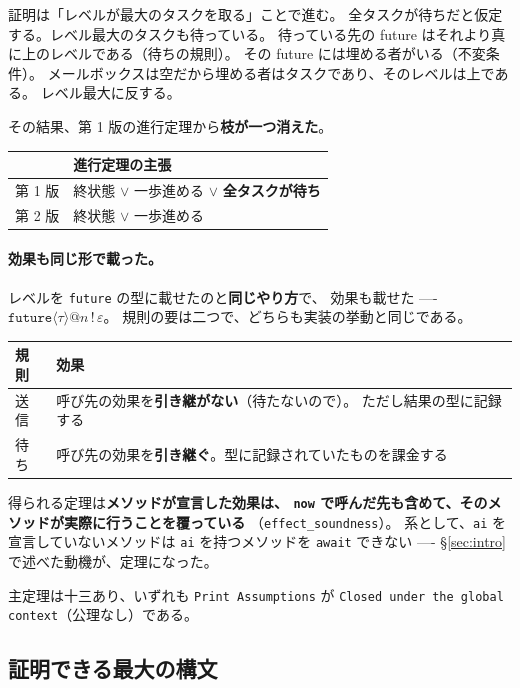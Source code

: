 \documentclass[11pt,a4paper]{ltjsarticle}
\theoremstyle{definition}
\theoremstyle{remark}
\begin{document}
証明は「レベルが最大のタスクを取る」ことで進む。
全タスクが待ちだと仮定する。レベル最大のタスクも待っている。
待っている先の future はそれより真に上のレベルである（待ちの規則）。
その future には埋める者がいる（不変条件）。
メールボックスは空だから埋める者はタスクであり、そのレベルは上である。
レベル最大に反する。

その結果、第 1 版の進行定理から\textbf{枝が一つ消えた}。

\begin{center}
\begin{tabular}{ll}
\toprule
& 進行定理の主張 \\
\midrule
第 1 版 & 終状態 $\lor$ 一歩進める $\lor$ \textbf{全タスクが待ち} \\
第 2 版 & 終状態 $\lor$ 一歩進める \\
\bottomrule
\end{tabular}
\end{center}

\paragraph{効果も同じ形で載った。}
レベルを \texttt{future} の型に載せたのと\textbf{同じやり方}で、
効果も載せた ---- $\mathtt{future}\langle\tau\rangle@n\,!\,\varepsilon$。
規則の要は二つで、どちらも実装の挙動と同じである。

\begin{center}
\small
\begin{tabular}{@{}lp{8.4cm}@{}}
\toprule
規則 & 効果 \\
\midrule
送信 & 呼び先の効果を\textbf{引き継がない}（待たないので）。
  ただし結果の型に記録する \\
待ち & 呼び先の効果を\textbf{引き継ぐ}。型に記録されていたものを課金する \\
\bottomrule
\end{tabular}
\end{center}

得られる定理は\textbf{メソッドが宣言した効果は、
\texttt{now} で呼んだ先も含めて、そのメソッドが実際に行うことを覆っている}
（\texttt{effect\_soundness}）。
系として、\texttt{ai} を宣言していないメソッドは
\texttt{ai} を持つメソッドを \texttt{await} できない ----
\S\ref{sec:intro} で述べた動機が、定理になった。

主定理は十三あり、いずれも \texttt{Print Assumptions} が
\texttt{Closed under the global context}（公理なし）である。

\subsection{証明できる最大の構文}
\end{document}
